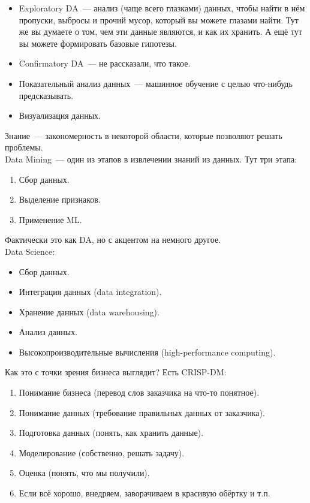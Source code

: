 \documentclass{article}
\begin{document}
    \begin{itemize}
        \item Exploratory DA~--- анализ (чаще всего глазками) данных, чтобы найти в нём пропуски, выбросы и прочий мусор, который вы можете глазами найти. Тут же вы думаете о том, чем эти данные являются, и как их хранить. А ещё тут вы можете формировать базовые гипотезы.
        \item Confirmatory DA~--- не рассказали, что такое.
        \item Показательный анализ данных~--- машинное обучение с целью что-нибудь предсказывать.
        \item Визуализация данных.
    \end{itemize}
    Знание~--- закономерность в некоторой области, которые позволяют решать проблемы.\\
    Data Mining~--- один из этапов в извлечении знаний из данных. Тут три этапа:
    \begin{enumerate}
        \item Сбор данных.
        \item Выделение признаков.
        \item Применение ML.
    \end{enumerate}
    Фактически это как DA, но с акцентом на немного другое.\\
    Data Science:
    \begin{itemize}
        \item Сбор данных.
        \item Интеграция данных (data integration).
        \item Хранение данных (data warehousing).
        \item Анализ данных.
        \item Высокопроизводительные вычисления (high-performance computing).
    \end{itemize}
    Как это с точки зрения бизнеса выглядит? Есть CRISP-DM:
    \begin{enumerate}
        \item Понимание бизнеса (перевод слов заказчика на что-то понятное).
        \item Понимание данных (требование правильных данных от заказчика).
        \item Подготовка данных (понять, как хранить данные).
        \item Моделирование (собственно, решать задачу).
        \item Оценка (понять, что мы получили).
        \item Если всё хорошо, внедряем, заворачиваем в красивую обёртку и т.п.
    \end{enumerate}
\end{document}
